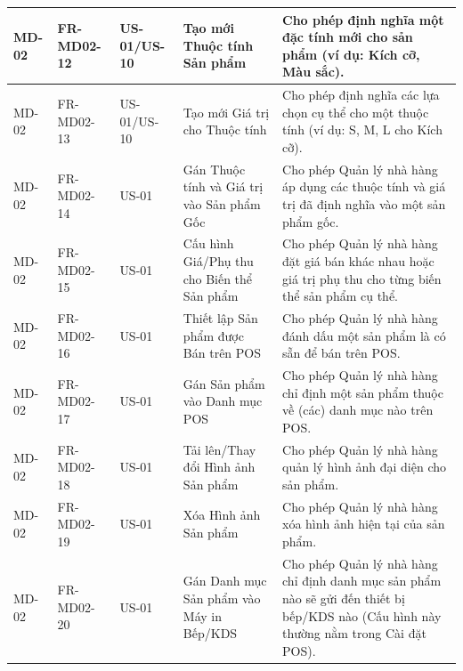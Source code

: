 \begin{longtable}{|m{2cm}|m{2.5cm}|m{2cm}|m{4.5cm}|m{4cm}|}
\hline
MD-02 & FR-MD02-12 & US-01/US-10 & Tạo mới Thuộc tính Sản phẩm & Cho phép định nghĩa một đặc tính mới cho sản phẩm (ví dụ: Kích cỡ, Màu sắc). \\
\hline
MD-02 & FR-MD02-13 & US-01/US-10 & Tạo mới Giá trị cho Thuộc tính & Cho phép định nghĩa các lựa chọn cụ thể cho một thuộc tính (ví dụ: S, M, L cho Kích cỡ). \\
\hline
MD-02 & FR-MD02-14 & US-01 & Gán Thuộc tính và Giá trị vào Sản phẩm Gốc & Cho phép Quản lý nhà hàng áp dụng các thuộc tính và giá trị đã định nghĩa vào một sản phẩm gốc. \\
\hline
MD-02 & FR-MD02-15 & US-01 & Cấu hình Giá/Phụ thu cho Biến thể Sản phẩm & Cho phép Quản lý nhà hàng đặt giá bán khác nhau hoặc giá trị phụ thu cho từng biến thể sản phẩm cụ thể. \\
\hline
MD-02 & FR-MD02-16 & US-01 & Thiết lập Sản phẩm được Bán trên POS & Cho phép Quản lý nhà hàng đánh dấu một sản phẩm là có sẵn để bán trên POS. \\
\hline
MD-02 & FR-MD02-17 & US-01 & Gán Sản phẩm vào Danh mục POS & Cho phép Quản lý nhà hàng chỉ định một sản phẩm thuộc về (các) danh mục nào trên POS. \\
\hline
MD-02 & FR-MD02-18 & US-01 & Tải lên/Thay đổi Hình ảnh Sản phẩm & Cho phép Quản lý nhà hàng quản lý hình ảnh đại diện cho sản phẩm. \\
\hline
MD-02 & FR-MD02-19 & US-01 & Xóa Hình ảnh Sản phẩm & Cho phép Quản lý nhà hàng xóa hình ảnh hiện tại của sản phẩm. \\
\hline
MD-02 & FR-MD02-20 & US-01 & Gán Danh mục Sản phẩm vào Máy in Bếp/KDS & Cho phép Quản lý nhà hàng chỉ định danh mục sản phẩm nào sẽ gửi đến thiết bị bếp/KDS nào (Cấu hình này thường nằm trong Cài đặt POS). \\
\hline

\end{longtable}

